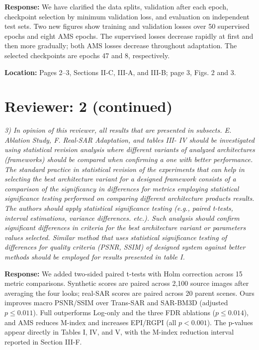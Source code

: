 \documentclass[11pt,letterpaper]{article}
\begin{document}
\textbf{Response:} We have clarified the data splits, validation after each epoch, checkpoint selection by minimum validation loss, and evaluation on independent test sets. Two new figures show training and validation losses over 50 supervised epochs and eight AMS epochs. The supervised losses decrease rapidly at first and then more gradually; both AMS losses decrease throughout adaptation. The selected checkpoints are epochs 47 and 8, respectively.

\textbf{Location:} Pages 2--3, Sections II-C, III-A, and III-B; page 3, Figs. 2 and 3.

\clearpage
\section*{Reviewer: 2 (continued)}
\textit{3) In opinion of this reviewer, all results that are presented in subsects. E. Ablation Study, F. Real-SAR Adaptation, and tables III- IV should be investigated using statistical revision analysis where different variants of analyzed architectures (frameworks) should be compared when confirming a one with better performance. The standard practice in statistical revision of the experiments that can help in selecting the best architecture variant for a designed framework consists of a comparison of the significancy in differences for metrics employing statistical significance testing performed on comparing different architecture products\textasciiacute{} results. The authors should apply statistical significance testing (e.g., paired t-tests, interval estimations, variance differences. etc.). Such analysis should confirm significant differences in criteria for the best architecture variant or parameters\textasciiacute{} values selected. Similar method that uses statistical significance testing of differences for quality criteria (PSNR, SSIM) of designed system against better methods should be employed for results presented in table I.}

\medskip
\textbf{Response:} We added two-sided paired t-tests with Holm correction across 15 metric comparisons. Synthetic scores are paired across 2,100 source images after averaging the four looks; real-SAR scores are paired across 20 parent scenes. Ours improves macro PSNR/SSIM over Trans-SAR and SAR-BM3D (adjusted $p\leq0.011$). Full outperforms Log-only and the three FDR ablations ($p\leq0.014$), and AMS reduces M-index and increases EPI/RGPI (all $p<0.001$). The p-values appear directly in Tables I, IV, and V, with the M-index reduction interval reported in Section III-F.
\end{document}
